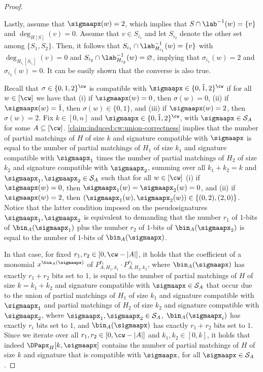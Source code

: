 \begin{proof}
\begin{claimproof}
        Lastly, assume that $\sigmaapx(w)=2$,
        which implies that $S \cap \lab^{-1}(w) = \{v\}$ and $\deg_{H[S]}(v)=0$.
        Assume that $v \in S_{i_1}$ and let $S_{i_2}$ denote the other set among $\{S_1,S_2\}$.
        Then, it follows that $S_{i_1} \cap \lab^{-1}_{H_{i_1}}(w) = \{v\}$ with $\deg_{H_{i_1}[S_{i_1}]}(v)=0$
        and $S_{i_2} \cap \lab^{-1}_{H_{i_2}}(w) = \varnothing$,
        implying that $\sigma_{i_1}(w) = 2$ and $\sigma_{i_2}(w) = 0$.
        It can be easily shown that the converse is also true.
    \end{claimproof}

    Recall that $\sigma \in \{0,1,2\}^{\cw}$ is compatible with $\sigmaapx \in \{0,\tilde{1},2\}^{\cw}$
    if for all $w \in [\cw]$ we have that
    (i) if $\sigmaapx(w) = 0$, then $\sigma(w) = 0$,
    (ii) if $\sigmaapx(w) = \tilde{1}$, then $\sigma(w) \in \{0,1\}$, and
    (iii) if $\sigmaapx(w) = 2$, then $\sigma(w) = 2$.
    Fix $k \in [0,n]$ and $\sigmaapx \in \{0,\tilde{1},2\}^{\cw}$, with $\sigmaapx \in \mathcal{S}_A$
    for some $A \subseteq [\cw]$.
    \cref{claim:induced:cw:union-correctness} implies that the number of partial matchings of $H$ of size $k$
    and signature compatible with $\sigmaapx$ is equal to
    the number of partial matchings of $H_1$ of size $k_1$ and signature compatible with $\sigmaapx_1$
    times the number of partial matchings of $H_2$ of size $k_2$ and signature compatible with $\sigmaapx_2$,
    summing over all $k_1+k_2=k$ and $\sigmaapx_1,\sigmaapx_2 \in \mathcal{S}_A$ such that for all $w \in [\cw]$
    (i) if $\sigmaapx(w) = 0$, then $\sigmaapx_1(w) = \sigmaapx_2(w) = 0$,
    and (ii) if $\sigmaapx(w) = 2$, then $(\sigmaapx_1(w),\sigmaapx_2(w)) \in \{(0,2),(2,0)\}$.
    Notice that the latter condition imposed on the pseudosignatures $\sigmaapx_1,\sigmaapx_2$ is equivalent to
    demanding that the number $r_1$ of $1$-bits of $\bin_A(\sigmaapx_1)$ plus the number $r_2$ of $1$-bits of $\bin_A(\sigmaapx_2)$
    is equal to the number of $1$-bits of $\bin_A(\sigmaapx)$.

    In that case, for fixed $r_1,r_2 \in [0,\cw-|A|]$, it holds that the coefficient of a
    monomial $x^{\bin_A(\sigmaapx)}$ of $P_{A,H_1,k_1}^{r_1} \cdot P_{A,H_2,k_2}^{r_2}$,
    where $\bin_A(\sigmaapx)$ has exactly $r_1+r_2$ bits set to $1$,
    is equal to the number of partial matchings of $H$ of size $k = k_1+k_2$ and signature compatible
    with $\sigmaapx \in \mathcal{S}_A$
    that occur due to the union of partial matchings of $H_1$ of size $k_1$ and signature compatible with $\sigmaapx_1$
    and partial matchings of $H_2$ of size $k_2$ and signature compatible with $\sigmaapx_2$,
    where $\sigmaapx_1, \sigmaapx_2 \in \mathcal{S}_A$, $\bin_A(\sigmaapx_i)$ has exactly $r_i$ bits set to $1$,
    and $\bin_A(\sigmaapx)$ has exactly $r_1+r_2$ bits set to $1$.
    Since we iterate over all $r_1,r_2 \in [0,\cw-|A|]$ and $k_1,k_2 \in [0,k]$,
    it holds that indeed $\DPapx_H[k,\sigmaapx]$ contains the number of partial matchings of $H$ of size $k$
    and signature that is compatible with $\sigmaapx$, for all $\sigmaapx \in \mathcal{S}_A$.


\end{proof}
